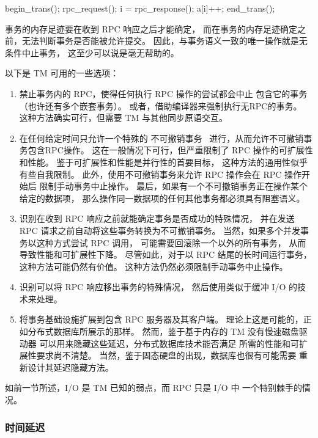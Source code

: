\begin{VerbatimN}[samepage=true]
begin_trans();
rpc_request();
i = rpc_response();
a[i]++;
end_trans();
\end{VerbatimN}

事务的内存足迹要在收到 RPC 响应之后才能确定，
而在事务的内存足迹确定之前，无法判断事务是否能被允许提交。
因此，与事务语义一致的唯一操作就是无条件中止事务，
这至少可以说是毫无帮助的。

以下是 TM 可用的一些选项：

\begin{enumerate}
\item	禁止事务内的 RPC，使得任何执行 RPC 操作的尝试都会中止
	包含它的事务（也许还有多个嵌套事务）。
	或者，借助编译器来强制执行无RPC的事务。
	这种方法确实可行，但需要 TM 与其他同步原语交互。
\item	在任何给定时间只允许一个特殊的
	不可撤销事务~\cite{SpearMichaelScott2008InevitableSTM}
	进行，从而允许不可撤销事务包含RPC操作。
	这在一般情况下可行，但严重限制了 RPC 操作的可扩展性和性能。
	鉴于可扩展性和性能是并行性的首要目标，
	这种方法的通用性似乎有些自我限制。
	此外，使用不可撤销事务来允许 RPC 操作会在 RPC 操作开始后
	限制手动事务中止操作。
	最后，如果有一个不可撤销事务正在操作某个给定的数据项，
	那么操作同一数据项的任何其他事务都必须具有阻塞语义。
\item	识别在收到 RPC 响应之前就能确定事务是否成功的特殊情况，
	并在发送 RPC 请求之前自动将这些事务转换为不可撤销事务。
	当然，如果多个并发事务以这种方式尝试 RPC 调用，
	可能需要回滚除一个以外的所有事务，
	从而导致性能和可扩展性下降。
	尽管如此，对于以 RPC 结尾的长时间运行事务，
	这种方法可能仍然有价值。
	这种方法仍然必须限制手动事务中止操作。
\item	识别可以将 RPC 响应移出事务的特殊情况，
	然后使用类似于缓冲 I/O 的技术来处理。
\item	将事务基础设施扩展到包含 RPC 服务器及其客户端。
	理论上这是可能的，正如分布式数据库所展示的那样。
	然而，鉴于基于内存的 TM 没有慢速磁盘驱动器
	可以用来隐藏这些延迟，分布式数据库技术能否满足
	所需的性能和可扩展性要求尚不清楚。
	当然，鉴于固态硬盘的出现，数据库也很有可能需要
	重新设计其延迟隐藏方法。
\end{enumerate}

如前一节所述，I/O 是 TM 已知的弱点，而 RPC 只是 I/O 中
一个特别棘手的情况。

\subsubsection{时间延迟}
\label{sec:future:Time Delays}

